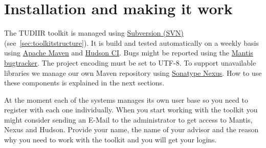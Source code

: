 \documentclass[a4paper,twoside]{book}      %
\begin{document}
\chapter{Installation and making it work}
The TUDIIR toolkit is managed using \href{http://subversion.apache.org/}{Subversion (SVN)} (see~\ref{sec:toolkitstructure}). It is build and tested automatically on a weekly basis using \href{http://maven.apache.org/}{Apache Maven} and \href{http://hudson-ci.org/}{Hudson CI}. Bugs might be reported using the \href{http://www.mantisbt.org/}{Mantis bugtracker}. The project encoding must be set to UTF-8. To support unavailable libraries we manage our own Maven repository using \href{http://nexus.sonatype.org/}{Sonatype Nexus}. How to use these components is explained in the next sections.

At the moment each of the systems manages its own user base so you need to register with each one individually. When you start working with the toolkit you might consider sending an E-Mail to the administrator to get access to Mantis, Nexus and Hudson. Provide your name, the name of your advisor and the reason why you need to work with the toolkit and you will get your logins.
\end{document}

